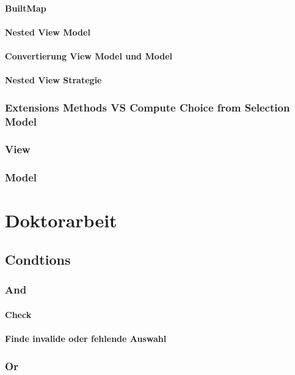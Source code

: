 \documentclass[12pt, twoside]{article}
\begin{document}
\paragraph{BuiltMap}
\paragraph{Nested View Model}
\paragraph{Convertierung View Model und Model}
\paragraph{Nested View Strategie}
\subsubsection{Extensions Methods VS Compute Choice from Selection Model}

\subsubsection{View}
\subsubsection{Model}

\section{Doktorarbeit}
\subsection{Condtions}
\subsubsection{And}
\paragraph{Check}
\paragraph{Finde invalide oder fehlende Auswahl}

\subsubsection{Or}
\end{document}
